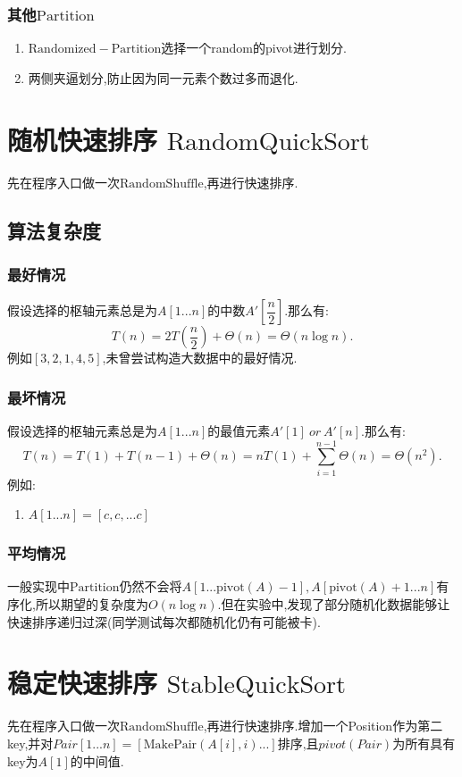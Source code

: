 \documentclass[UTF8]{ctexart}
\begin{document}
\subsubsection{其他$\mathrm{Partition}$}
\begin{enumerate}[1.]
    \item $\mathrm{Randomized-Partition}$选择一个random的pivot进行划分.
    \item 两侧夹逼划分,防止因为同一元素个数过多而退化.
\end{enumerate}

\newpage
\section{随机快速排序 $\mathrm{RandomQuickSort}$}
先在程序入口做一次$\mathrm{RandomShuffle}$,再进行快速排序.
\subsection{算法复杂度}
\subsubsection{最好情况}
假设选择的枢轴元素总是为$A[1...n]$的中数$A'[\dfrac{n}{2}]$.那么有:
$$
T(n)=2T(\frac{n}{2}) + \Theta(n)=\Theta(n\log n).
$$
例如$[3,2,1,4,5]$,未曾尝试构造大数据中的最好情况.
\subsubsection{最坏情况}
假设选择的枢轴元素总是为$A[1...n]$的最值元素$A'[1]\ or\ A'[n]$.那么有:
$$
T(n) = T(1) + T(n-1) +\Theta(n)=nT(1) + \sum_{i=1}^{n-1}\Theta(n) = \Theta(n^2).
$$
例如:
\begin{enumerate}[1.]
\item    $A[1...n] = [c,c,...c]$
\end{enumerate}
\subsubsection{平均情况}
一般实现中$\mathrm{Partition}$仍然不会将$A[1...\mathrm{pivot}(A)-1],A[\mathrm{pivot}(A)+1...n]$有序化,所以期望的复杂度为$O(n\log n)$.但在实验中,发现了部分随机化数据能够让快速排序递归过深(同学测试每次都随机化仍有可能被卡).
\section{稳定快速排序 $\mathrm{StableQuickSort}$}
先在程序入口做一次$\mathrm{RandomShuffle}$,再进行快速排序.增加一个Position作为第二key,并对$Pair[1...n]=[\mathrm{MakePair}(A[i],i)...]$排序,且$pivot(Pair)$为所有具有key为$A[1]$的中间值.
\newpage
\end{document}

